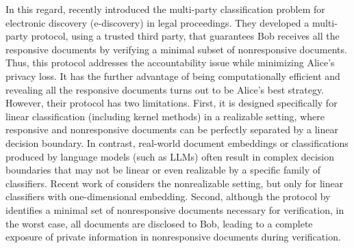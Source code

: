 






In this regard, \cite{dong2022classification} recently introduced the multi-party classification problem for electronic discovery (e-discovery) in legal proceedings. 
They developed a multi-party protocol, using a trusted third party, that guarantees Bob receives all the responsive documents by verifying a minimal subset of nonresponsive documents. 
Thus, this protocol addresses the accountability issue while minimizing Alice's privacy loss. It has the further advantage of being computationally efficient and revealing all the responsive documents turns out to be Alice's best strategy.
However, their protocol has two limitations. 
First, it is designed specifically for linear classification (including kernel methods) in a realizable setting, where responsive and nonresponsive documents can be perfectly separated by a linear decision boundary. 
In contrast, real-world document embeddings or classifications produced by language models (such as LLMs) often result in complex decision boundaries that may not be linear or even realizable by a specific family of classifiers.
Recent work of \citet*{dong2024error} considers the nonrealizable setting, but only for linear classifiers with one-dimensional embedding.
Second, although the protocol by~\cite{dong2022classification} identifies a minimal set of nonresponsive documents necessary for verification, in the worst case, all documents are disclosed to Bob, leading to a complete exposure of private information in nonresponsive documents during verification.


